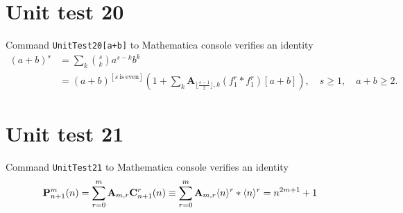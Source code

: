 \documentclass[12pt, letterpaper]{amsart}
\newcommand \power [2]{\langle #1 \rangle^{#2}}
\newcommand \coeffA [3][A]{\mathbf{#1}_{{#2},{#3}}}
\theoremstyle{definition}
\theoremstyle{remark}
\numberwithin{equation}{section}
\begin{document}
\section*{Unit test 20}
Command \verb"UnitTest20[a+b]" to Mathematica console verifies an identity
\begin{equation*}
\begin{split}
(a+b)^s
&=\sum_{k} \binom{s}{k} a^{s-k} b^k \\
&=(a+b)^{[s \ \mathrm{is} \ \mathrm{even}]} \left(1 + \sum_{k}^{ \ }\mathbf{A}_{\lfloor \tfrac{s-1}{2} \rfloor, k}(f^{r}_{1} \ast f^{r}_{1})[a+b]\right), \quad s\geq 1, \quad a+b\geq 2.
\end{split}
\end{equation*}
\section*{Unit test 21}
Command \verb"UnitTest21" to Mathematica console verifies an identity
\begin{equation*}
\label{polynomials_p_and_convolution}
\mynotation_{n+1}(n)
=\sum_{r=0}^{m} \coeffA{m}{r} \convSum_{n+1}^{r}(n)
\equiv \sum_{r=0}^{m} \coeffA{m}{r} \power{n}{r} \ast \power{n}{r} = n^{2m+1}+1
\end{equation*}
\end{document}

